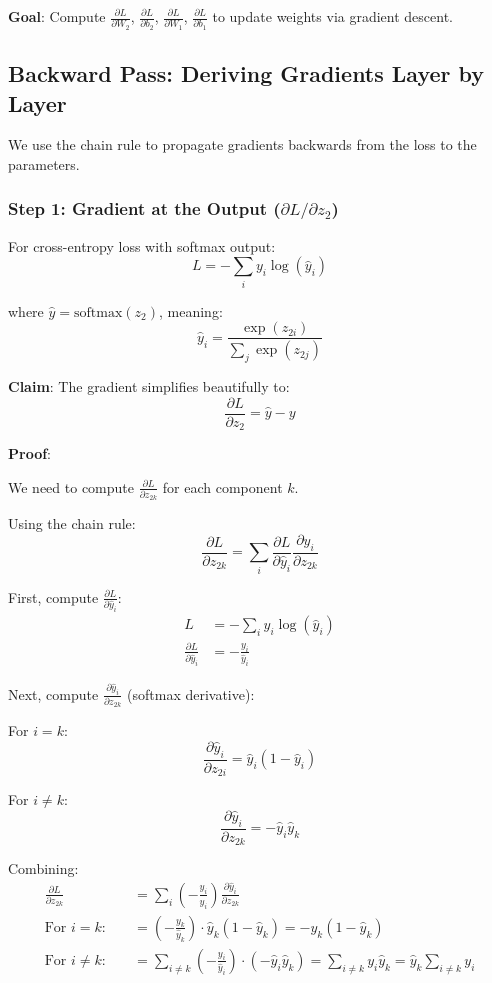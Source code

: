 \documentclass[11pt,oneside]{book}
\begin{document}
\textbf{Goal}: Compute $\frac{\partial L}{\partial W_2}$, $\frac{\partial L}{\partial b_2}$, $\frac{\partial L}{\partial W_1}$, $\frac{\partial L}{\partial b_1}$ to update weights via gradient descent.

\subsection{Backward Pass: Deriving Gradients Layer by Layer}

We use the chain rule to propagate gradients backwards from the loss to the parameters.

\subsubsection{Step 1: Gradient at the Output ($\partial L/\partial z_2$)}

For cross-entropy loss with softmax output:
\[
L = -\sum_i y_i \log(\hat{y}_i)
\]

where $\hat{y} = \text{softmax}(z_2)$, meaning:
\[
\hat{y}_i = \frac{\exp(z_{2i})}{\sum_j \exp(z_{2j})}
\]

\textbf{Claim}: The gradient simplifies beautifully to:
\[
\frac{\partial L}{\partial z_2} = \hat{y} - y
\]

\textbf{Proof}:

We need to compute $\frac{\partial L}{\partial z_{2k}}$ for each component $k$.

Using the chain rule:
\[
\frac{\partial L}{\partial z_{2k}} = \sum_i \frac{\partial L}{\partial \hat{y}_i} \frac{\partial \hat{y}_i}{\partial z_{2k}}
\]

First, compute $\frac{\partial L}{\partial \hat{y}_i}$:
\begin{align*}
L &= -\sum_i y_i \log(\hat{y}_i) \\
\frac{\partial L}{\partial \hat{y}_i} &= -\frac{y_i}{\hat{y}_i}
\end{align*}

Next, compute $\frac{\partial \hat{y}_i}{\partial z_{2k}}$ (softmax derivative):

For $i = k$:
\[
\frac{\partial \hat{y}_i}{\partial z_{2i}} = \hat{y}_i(1 - \hat{y}_i)
\]

For $i \neq k$:
\[
\frac{\partial \hat{y}_i}{\partial z_{2k}} = -\hat{y}_i \hat{y}_k
\]

Combining:
\begin{align*}
\frac{\partial L}{\partial z_{2k}} &= \sum_i \left(-\frac{y_i}{\hat{y}_i}\right) \frac{\partial \hat{y}_i}{\partial z_{2k}} \\
\text{For } i = k: \quad &= \left(-\frac{y_k}{\hat{y}_k}\right) \cdot \hat{y}_k(1 - \hat{y}_k) = -y_k(1 - \hat{y}_k) \\
\text{For } i \neq k: \quad &= \sum_{i \neq k} \left(-\frac{y_i}{\hat{y}_i}\right) \cdot (-\hat{y}_i \hat{y}_k) = \sum_{i \neq k} y_i \hat{y}_k = \hat{y}_k \sum_{i \neq k} y_i
\end{align*}
\end{document}
